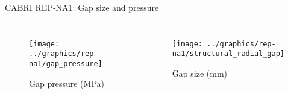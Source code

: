 \begin{frame}{CABRI REP-NA1: Gap size and pressure}
  \footnotesize 
  
  \begin{columns}[t]


  \begin{figure}[h]
    \texttt{[image: ../graphics/rep-na1/gap\_pressure]}
    \caption{Gap pressure (MPa)}
  \end{figure}  


  \begin{figure}[h]
    \texttt{[image: ../graphics/rep-na1/structural\_radial\_gap]}
    \caption{Gap size (mm)}
  \end{figure}  
  
  \end{columns}

\end{frame}
